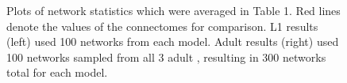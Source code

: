 \begin{figure}[H]
  \centering
  
  \caption{Plots of network statistics which were averaged in Table 1. Red lines denote the values of the \ce connectomes for comparison. L1 results (left) used 100 networks from each model. Adult results (right) used 100 networks sampled from all 3 adult \ce, resulting in 300 networks total for each model.}
\end{figure}